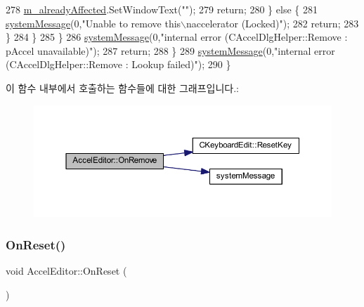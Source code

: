 \begin{DoxyCode}
278           \mbox{\hyperlink{class_accel_editor_ac3d2378be850611ee51689bd34475275}{m\_alreadyAffected}}.SetWindowText(\textcolor{stringliteral}{""});
279           \textcolor{keywordflow}{return};
280         \} \textcolor{keywordflow}{else} \{
281           \mbox{\hyperlink{system_8cpp_a747a9cb8e015a3d45cca636b5bd0fc69}{systemMessage}}(0,\textcolor{stringliteral}{"Unable to remove this\(\backslash\)naccelerator (Locked)"});
282           \textcolor{keywordflow}{return};
283         \}
284       \}
285     \}
286     \mbox{\hyperlink{system_8cpp_a747a9cb8e015a3d45cca636b5bd0fc69}{systemMessage}}(0,\textcolor{stringliteral}{"internal error (CAccelDlgHelper::Remove : pAccel unavailable)"});
287     \textcolor{keywordflow}{return};
288   \}
289   \mbox{\hyperlink{system_8cpp_a747a9cb8e015a3d45cca636b5bd0fc69}{systemMessage}}(0,\textcolor{stringliteral}{"internal error (CAccelDlgHelper::Remove : Lookup failed)"});
290 \}
\end{DoxyCode}
이 함수 내부에서 호출하는 함수들에 대한 그래프입니다.\+:
\nopagebreak
\begin{figure}[H]
\begin{center}
\leavevmode
\includegraphics[width=350pt]{class_accel_editor_a40b74b67b95694245502b15ceedd278c_cgraph}
\end{center}
\end{figure}
\mbox{\label{class_accel_editor_a1afed0a04125915ae1517e1b08879b8b}} 
\subsubsection{\texorpdfstring{On\+Reset()}{OnReset()}}
{\footnotesize\ttfamily void Accel\+Editor\+::\+On\+Reset (\begin{DoxyParamCaption}{ }\end{DoxyParamCaption})\hspace{0.3cm}{\ttfamily [protected]}}



